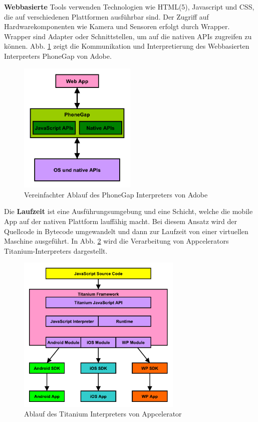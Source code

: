 \medskip
\textbf{Webbasierte} Tools verwenden Technologien wie HTML(5), Javascript und CSS, die auf verschiedenen Plattformen ausführbar sind. Der Zugriff auf Hardwarekomponenten wie Kamera und Sensoren erfolgt durch Wrapper. Wrapper sind Adapter oder Schnittstellen, um auf die nativen APIs zugreifen zu können. Abb. \ref{graph_interpreter_PhoneGap} zeigt die Kommunikation und Interpretierung des Webbasierten Interpreters PhoneGap von Adobe.

\begin{figure}[htbp]
	\centering
	\includegraphics[width=0.5\textwidth]{Bilder/Interpretation_Web_PhoneGap}
	\caption{Vereinfachter Ablauf des PhoneGap Interpreters von Adobe}\label{graph_interpreter_PhoneGap}
\end{figure} 

\medskip
Die \textbf{Laufzeit} ist eine Ausführungsumgebung und eine Schicht, welche die mobile App auf der nativen Plattform lauffähig macht. Bei diesem Ansatz wird der Quellcode in Bytecode umgewandelt und dann zur Laufzeit von einer virtuellen Maschine ausgeführt. In Abb. \ref{graph_interpreter_Titanium} wird die Verarbeitung von Appcelerators Titanium-Interpreters dargestellt.

\begin{figure}[htbp]
	\centering
	\includegraphics[width=0.7\textwidth]{Bilder/Interpretation_Runtime_Titanium}
	\caption{Ablauf des Titanium Interpreters von Appcelerator}\label{graph_interpreter_Titanium}
\end{figure}

